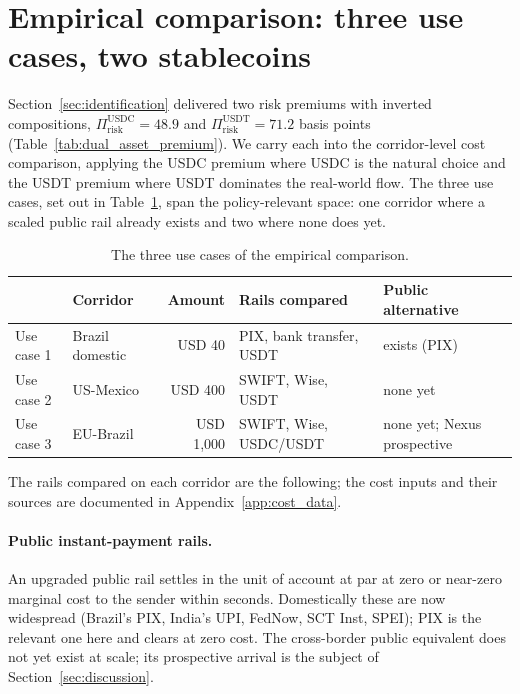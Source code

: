 \section{Empirical comparison: three use cases, two stablecoins}\label{sec:empirical_comparison}

Section~\ref{sec:identification} delivered two risk premiums with inverted compositions, $\Pi_{\text{risk}}^{\text{USDC}} = 48.9$ and $\Pi_{\text{risk}}^{\text{USDT}} = 71.2$ basis points (Table~\ref{tab:dual_asset_premium}). We carry each into the corridor-level cost comparison, applying the USDC premium where USDC is the natural choice and the USDT premium where USDT dominates the real-world flow. The three use cases, set out in Table~\ref{tab:use_cases}, span the policy-relevant space: one corridor where a scaled public rail already exists and two where none does yet.

\begin{table}[H]
\centering
\caption{The three use cases of the empirical comparison.}\label{tab:use_cases}
\begin{tabularx}{\textwidth}{llr>{\raggedright\arraybackslash}X>{\raggedright\arraybackslash}X}
\toprule
 & Corridor & Amount & Rails compared & Public alternative \\
\midrule
Use case 1 & Brazil domestic & USD 40      & PIX, bank transfer, USDT & exists (PIX) \\
Use case 2 & US-Mexico       & USD 400     & SWIFT, Wise, USDT        & none yet \\
Use case 3 & EU-Brazil       & USD 1{,}000 & SWIFT, Wise, USDC/USDT   & none yet; Nexus prospective \\
\bottomrule
\end{tabularx}
\end{table}

The rails compared on each corridor are the following; the cost inputs and their sources are documented in Appendix~\ref{app:cost_data}.

\paragraph{Public instant-payment rails.} An upgraded public rail settles in the unit of account at par at zero or near-zero marginal cost to the sender within seconds. Domestically these are now widespread (Brazil's PIX, India's UPI, FedNow, SCT Inst, SPEI); PIX is the relevant one here and clears at zero cost. The cross-border public equivalent does not yet exist at scale; its prospective arrival is the subject of Section~\ref{sec:discussion}.

